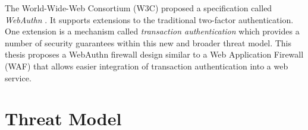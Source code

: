 The World-Wide-Web Consortium (W3C) proposed a specification called \textit{WebAuthn} \cite{webauthn}. It supports extensions to the traditional two-factor authentication. One extension is a mechanism called \textit{transaction authentication} which provides a number of security guarantees within this new and broader threat model. This thesis proposes a WebAuthn firewall design similar to a Web Application Firewall (WAF) that allows easier integration of transaction authentication into a web service.







\section{Threat Model}\label{Sec:ThreatModel}

